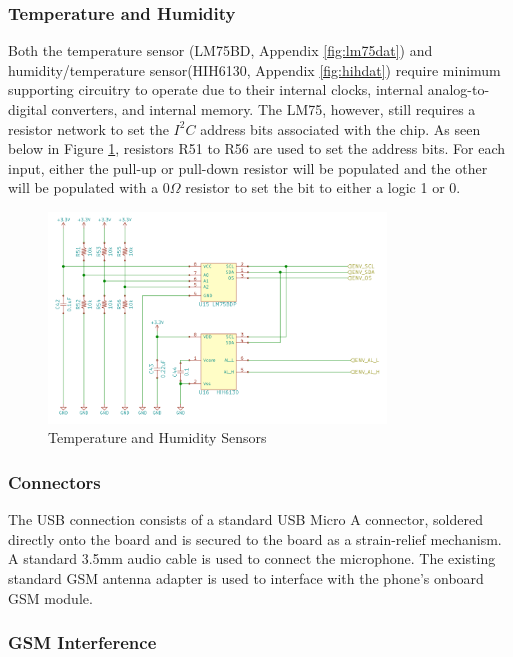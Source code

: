 \documentclass{article}
\numberwithin{figure}{section}
\numberwithin{equation}{section}
\begin{document}
{\subsubsection{Temperature and Humidity}

Both the temperature sensor (LM75BD, Appendix \ref{fig:lm75dat}) and humidity/temperature sensor(HIH6130, Appendix \ref{fig:hihdat}) require minimum supporting circuitry to operate due to their internal clocks, internal analog-to-digital converters, and internal memory. The LM75, however, still requires a resistor network to set the $I^2 C$ address bits associated with the chip. As seen below in Figure \ref{fig:tandh}, resistors R51 to R56 are used to set the address bits. For each input, either the pull-up or pull-down resistor will be populated and the other will be populated with a 0$\Omega$ resistor to set the bit to either a logic 1 or 0.

\begin{figure}[H]
	\centering
	\includegraphics[width=0.8\textwidth]{temphumid}
	\caption{Temperature and Humidity Sensors}
	\label{fig:tandh}
\end{figure}

\subsubsection{Connectors}

The USB connection consists of a standard USB Micro A connector, soldered directly onto the board and is secured to the board as a strain-relief mechanism. A standard 3.5mm audio cable is used to connect the microphone. The existing standard GSM antenna adapter is used to interface with the phone’s onboard GSM module.


\subsubsection{GSM Interference}

}
\end{document}
